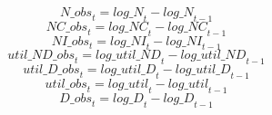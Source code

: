\begin{dmath}
{N\_obs}_{t}={log\_N}_{t}-{log\_N}_{t-1}
\end{dmath}
\begin{dmath}
{NC\_obs}_{t}={log\_NC}_{t}-{log\_NC}_{t-1}
\end{dmath}
\begin{dmath}
{NI\_obs}_{t}={log\_NI}_{t}-{log\_NI}_{t-1}
\end{dmath}
\begin{dmath}
{util\_ND\_obs}_{t}={log\_util\_ND}_{t}-{log\_util\_ND}_{t-1}
\end{dmath}
\begin{dmath}
{util\_D\_obs}_{t}={log\_util\_D}_{t}-{log\_util\_D}_{t-1}
\end{dmath}
\begin{dmath}
{util\_obs}_{t}={log\_util}_{t}-{log\_util}_{t-1}
\end{dmath}
\begin{dmath}
{D\_obs}_{t}={log\_D}_{t}-{log\_D}_{t-1}
\end{dmath}
